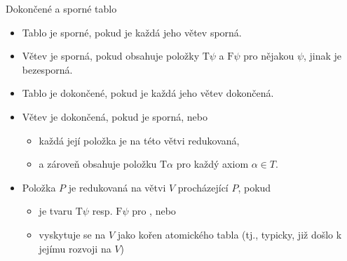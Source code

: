 \documentclass{beamer}
\begin{document}
\begin{frame}{Dokončené a sporné tablo}

    \begin{itemize}
        \item Tablo je \alert{sporné}, pokud je každá jeho větev sporná.
        \item Větev je \alert{sporná}, pokud obsahuje položky $\mathrm{T}\psi$ a $\mathrm{F}\psi$ pro nějakou  $\psi$, jinak je \alert{bezesporná}.
        \item Tablo je \alert{dokončené}, pokud je každá jeho větev dokončená.
        \item Větev je \alert{dokončená}, pokud je sporná, nebo
        \begin{itemize}
            \item každá její položka je na této větvi \alert{redukovaná},
            \item a zároveň obsahuje položku $\mathrm{T}\alpha$ pro každý axiom $\alpha\in T$.
        \end{itemize}
         
        \item Položka $P$ je \alert{redukovaná} na větvi $V$ procházející $P$, pokud 
        \begin{itemize}
            \item je tvaru $\mathrm{T}\psi$ resp. $\mathrm{F}\psi$ pro , nebo
            \item {} vyskytuje se na $V$ jako kořen atomického tabla (tj., typicky, již došlo k jejímu rozvoji na $V$)
        \end{itemize}
    \end{itemize}

\end{frame}
\end{document}

